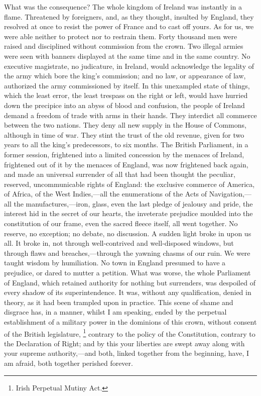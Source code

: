 What was the consequence? The whole kingdom of Ireland was instantly in a flame. Threatened by foreigners, and, as they thought, insulted by England, they resolved at once to resist the power of France and to cast off yours. As for us, we were able neither to protect nor to restrain them. Forty thousand men were raised and disciplined without commission from the crown. Two illegal armies were seen with banners displayed at the same time and in the same country. No executive magistrate, no judicature, in Ireland, would acknowledge the legality of the army which bore the king's commission; and no law, or appearance of law, authorized the army commissioned by itself. In this unexampled state of things, which the least error, the least trespass on the right or left, would have hurried down the precipice into an abyss of blood and confusion, the people of Ireland demand a freedom of trade with arms in their hands. They interdict all commerce between the two nations. They deny all new supply in the House of Commons, although in time of war. They stint the trust of the old revenue, given for two years to all the king's predecessors, to six months. The British Parliament, in a former session, frightened into a limited concession by the menaces of Ireland, frightened out of it by the menaces of England, was now frightened back again, and made an universal surrender of all that had been thought the peculiar, reserved, uncommunicable rights of England: the exclusive commerce of America, of Africa, of the West Indies,—all the enumerations of the Acts of Navigation,—all the manufactures,—iron, glass, even the last pledge of jealousy and pride, the interest hid in the secret of our hearts, the inveterate prejudice moulded into the constitution of our frame, even the sacred fleece itself, all went together. No reserve, no exception; no debate, no discussion. A sudden light broke in upon us all. It broke in, not through well-contrived and well-disposed windows, but through flaws and breaches,—through the yawning chasms of our ruin. We were taught wisdom by humiliation. No town in England presumed to have a prejudice, or dared to mutter a petition. What was worse, the whole Parliament of England, which retained authority for nothing but surrenders, was despoiled of every shadow of its superintendence. It was, without any qualification, denied in theory, as it had been trampled upon in practice. This scene of shame and disgrace has, in a manner, whilst I am speaking, ended by the perpetual establishment of a military power in the dominions of this crown, without consent of the British legislature, 
\footnote{ Irish Perpetual Mutiny Act.}
 contrary to the policy of the Constitution, contrary to the Declaration of Right; and by this your liberties are swept away along with your supreme authority,—and both, linked together from the beginning, have, I am afraid, both together perished forever.

